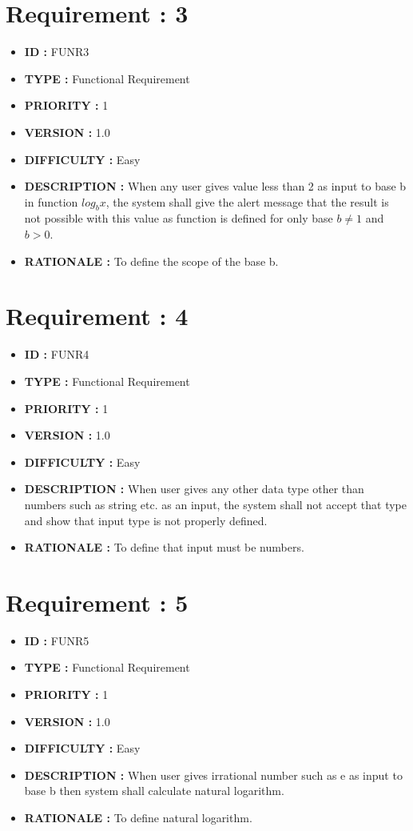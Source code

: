 \documentclass[a4paper, 11pt]{article}
\begin{document}
\section*{Requirement : 3}
     \begin{itemize}[noitemsep]
      \item \textbf{ID  : } FUNR3
      \item \textbf{TYPE  : } Functional Requirement
      \item \textbf{PRIORITY  : } 1
      \item \textbf{VERSION  : } 1.0
      \item\textbf{DIFFICULTY  :} Easy
      \item \textbf{DESCRIPTION  : } When any user gives value less than 2 as input to base b in function $log_b x$, the system shall give the alert message that the result is not possible with this value as function is defined for only base $b\neq1$ and $b>0$.
      \item\textbf{RATIONALE  : } To define the scope of the base b.
    \end{itemize}
    
\section*{Requirement : 4}
     \begin{itemize}[noitemsep]
      \item \textbf{ID  : } FUNR4
      \item \textbf{TYPE  : } Functional Requirement
      \item \textbf{PRIORITY  : } 1
      \item \textbf{VERSION  : } 1.0
      \item\textbf{DIFFICULTY  :} Easy
      \item \textbf{DESCRIPTION  : } When user gives any other data type other than numbers such as string etc. as an input, the system shall not accept that type and show that input type is not properly defined.
      \item\textbf{RATIONALE  : } To define that input must be numbers.
    \end{itemize}
    
\section*{Requirement : 5}
     \begin{itemize}[noitemsep]
      \item \textbf{ID  : } FUNR5
      \item \textbf{TYPE  : } Functional Requirement
      \item \textbf{PRIORITY  : } 1
      \item \textbf{VERSION  : } 1.0
      \item\textbf{DIFFICULTY  :} Easy
      \item \textbf{DESCRIPTION  : } When user gives irrational number such as e as input to base b then system shall calculate natural logarithm.
      \item\textbf{RATIONALE  : } To define natural logarithm.
    \end{itemize}
 
\end{document}
